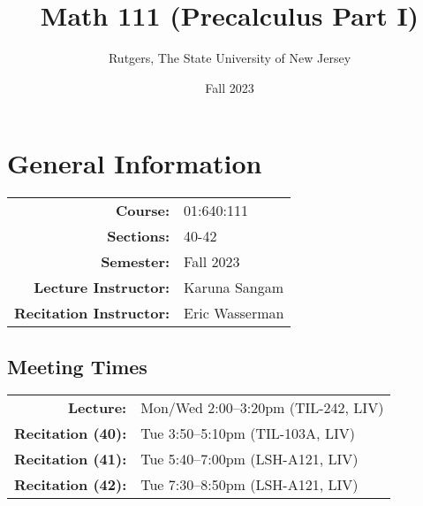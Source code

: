 \documentclass{article}
\title{Math 111 (Precalculus Part I)}
\author{Rutgers, The State University of New Jersey}
\date{Fall 2023}
\begin{document}
\maketitle

\section*{General Information}
\begin{center}
    \begin{tabular}{rl}
        \textbf{Course:} & 01:640:111 \\
        \textbf{Sections:} & 40-42 \\
        \textbf{Semester:} & Fall 2023 \\
        \textbf{Lecture Instructor:} & Karuna Sangam \\
        \textbf{Recitation Instructor:} & Eric Wasserman \\
    \end{tabular}
\end{center}

\subsection*{Meeting Times}

\begin{center}
    \begin{tabular}{rl}
        \textbf{Lecture:} & Mon/Wed 2:00--3:20pm (TIL-242, LIV) \\
        \textbf{Recitation (40):} & Tue 3:50--5:10pm (TIL-103A, LIV) \\
        \textbf{Recitation (41):} & Tue 5:40--7:00pm (LSH-A121, LIV) \\
        \textbf{Recitation (42):} & Tue 7:30--8:50pm (LSH-A121, LIV) \\
    \end{tabular}
\end{center}

\end{document}
